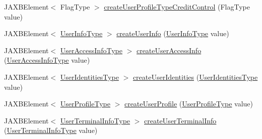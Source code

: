 \begin{DoxyCompactItemize}
\item 
JAXBElement$<$ FlagType $>$ \hyperlink{classcom_1_1telefonica_1_1schemas_1_1unica_1_1rest_1_1directory_1_1v1_1_1ObjectFactory_a4d8546f255df36fe598c7e350266e74f}{createUserProfileTypeCreditControl} (FlagType value)
\item 
JAXBElement$<$ \hyperlink{classcom_1_1telefonica_1_1schemas_1_1unica_1_1rest_1_1directory_1_1v1_1_1UserInfoType}{UserInfoType} $>$ \hyperlink{classcom_1_1telefonica_1_1schemas_1_1unica_1_1rest_1_1directory_1_1v1_1_1ObjectFactory_a9afbbf7e2f5a284c3db8657162bce9df}{createUserInfo} (\hyperlink{classcom_1_1telefonica_1_1schemas_1_1unica_1_1rest_1_1directory_1_1v1_1_1UserInfoType}{UserInfoType} value)
\item 
JAXBElement$<$ \hyperlink{classcom_1_1telefonica_1_1schemas_1_1unica_1_1rest_1_1directory_1_1v1_1_1UserAccessInfoType}{UserAccessInfoType} $>$ \hyperlink{classcom_1_1telefonica_1_1schemas_1_1unica_1_1rest_1_1directory_1_1v1_1_1ObjectFactory_ae29f91baa40f31403604aeb9154745e0}{createUserAccessInfo} (\hyperlink{classcom_1_1telefonica_1_1schemas_1_1unica_1_1rest_1_1directory_1_1v1_1_1UserAccessInfoType}{UserAccessInfoType} value)
\item 
JAXBElement$<$ \hyperlink{classcom_1_1telefonica_1_1schemas_1_1unica_1_1rest_1_1directory_1_1v1_1_1UserIdentitiesType}{UserIdentitiesType} $>$ \hyperlink{classcom_1_1telefonica_1_1schemas_1_1unica_1_1rest_1_1directory_1_1v1_1_1ObjectFactory_a1e45690137de2177798c71138948e894}{createUserIdentities} (\hyperlink{classcom_1_1telefonica_1_1schemas_1_1unica_1_1rest_1_1directory_1_1v1_1_1UserIdentitiesType}{UserIdentitiesType} value)
\item 
JAXBElement$<$ \hyperlink{classcom_1_1telefonica_1_1schemas_1_1unica_1_1rest_1_1directory_1_1v1_1_1UserProfileType}{UserProfileType} $>$ \hyperlink{classcom_1_1telefonica_1_1schemas_1_1unica_1_1rest_1_1directory_1_1v1_1_1ObjectFactory_a2232a571deb3e468c6e0fb3415149318}{createUserProfile} (\hyperlink{classcom_1_1telefonica_1_1schemas_1_1unica_1_1rest_1_1directory_1_1v1_1_1UserProfileType}{UserProfileType} value)
\item 
JAXBElement$<$ \hyperlink{classcom_1_1telefonica_1_1schemas_1_1unica_1_1rest_1_1directory_1_1v1_1_1UserTerminalInfoType}{UserTerminalInfoType} $>$ \hyperlink{classcom_1_1telefonica_1_1schemas_1_1unica_1_1rest_1_1directory_1_1v1_1_1ObjectFactory_a8e9c09609548d1f2c65ed93be8069c96}{createUserTerminalInfo} (\hyperlink{classcom_1_1telefonica_1_1schemas_1_1unica_1_1rest_1_1directory_1_1v1_1_1UserTerminalInfoType}{UserTerminalInfoType} value)

\end{DoxyCompactItemize}
